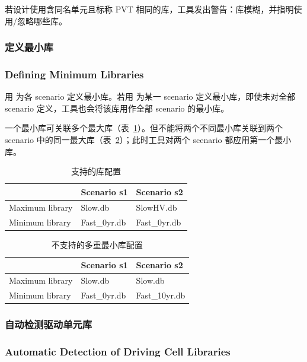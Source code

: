 若设计使用含同名单元且标称 PVT 相同的库，工具发出警告：库模糊，并指明使用/忽略哪些库。

\subsubsection{定义最小库}
\subsubsection*{Defining Minimum Libraries}

用  为各 scenario 定义最小库。若用  为某一 scenario 定义最小库，即使未对全部 scenario 定义，工具也会将该库用作全部 scenario 的最小库。

一个最小库可关联多个最大库（表~\ref{tab:dce-minlib-ok}）。但不能将两个不同最小库关联到两个 scenario 中的同一最大库（表~\ref{tab:dce-minlib-bad}）；此时工具对两个 scenario 都应用第一个最小库。

\begin{table}[htbp]
\centering
\caption{支持的库配置}
\label{tab:dce-minlib-ok}
\begin{tabular}{@{}lll@{}}
\toprule
 & Scenario s1 & Scenario s2 \\
\midrule
Maximum library & Slow.db & SlowHV.db \\
Minimum library & Fast\_0yr.db & Fast\_0yr.db \\
\bottomrule
\end{tabular}
\end{table}

\begin{table}[htbp]
\centering
\caption{不支持的多重最小库配置}
\label{tab:dce-minlib-bad}
\begin{tabular}{@{}lll@{}}
\toprule
 & Scenario s1 & Scenario s2 \\
\midrule
Maximum library & Slow.db & Slow.db \\
Minimum library & Fast\_0yr.db & Fast\_10yr.db \\
\bottomrule
\end{tabular}
\end{table}

\subsubsection{自动检测驱动单元库}
\subsubsection*{Automatic Detection of Driving Cell Libraries}

